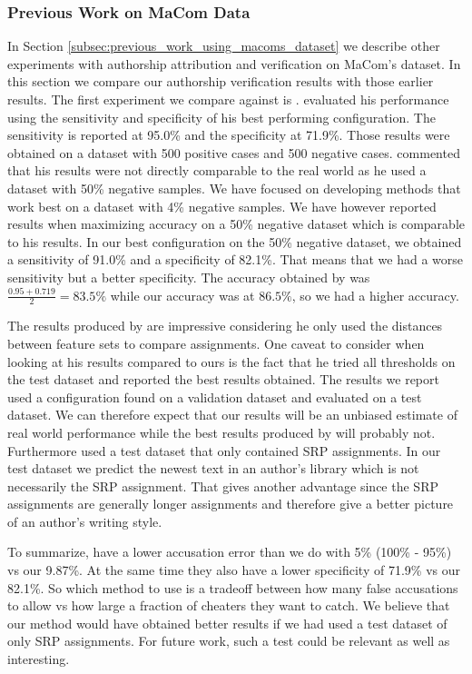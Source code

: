 \subsubsection{Previous Work on MaCom Data}

In Section \ref{subsec:previous_work_using_macoms_dataset} we describe other
experiments with authorship attribution and verification on MaCom's dataset.
In this section we compare our authorship verification results with those
earlier results. The first experiment we compare against is \citep{aalykke2016}.
\citet{aalykke2016} evaluated his performance using the sensitivity and
specificity of his best performing configuration. The sensitivity is reported at
95.0\% and the specificity at 71.9\%. Those results were obtained on a dataset
with 500 positive cases and 500 negative cases. \citet{aalykke2016} commented
that his results were not directly comparable to the real world as he used a
dataset with 50\% negative samples. We have focused on developing methods that
work best on a dataset with 4\% negative samples. We have however reported
results when maximizing accuracy on a 50\% negative dataset which is comparable
to his results. In our best configuration on the 50\% negative dataset, we
obtained a sensitivity of 91.0\% and a specificity of 82.1\%. That means that
we had a worse sensitivity but a better specificity. The accuracy obtained by
\citet{aalykke2016} was $\frac{0.95 + 0.719}{2} = 83.5\%$ while our accuracy was
at $86.5\%$, so we had a higher accuracy.

The results produced by \citet{aalykke2016} are impressive considering he only
used the distances between feature sets to compare assignments. One caveat to
consider when looking at his results compared to ours is the fact that he tried
all thresholds on the test dataset and reported the best results obtained.
The results we report used a configuration found on a validation dataset and
evaluated on a test dataset. We can therefore expect that our results will be
an unbiased estimate of real world performance while the best results produced
by \citet{aalykke2016} will probably not. Furthermore \citet{aalykke2016} used
a test dataset that only contained \gls{SRP} assignments. In our test dataset
we predict the newest text in an author's library which is not necessarily the
\gls{SRP} assignment. That gives \citet{aalykke2016} another advantage since
the \gls{SRP} assignments are generally longer assignments and therefore give a
better picture of an author's writing style.

To summarize, \citet{aalykke2016} have a lower accusation error than we do
with 5\% (100\% - 95\%) vs our 9.87\%. At the same time they also have a lower
specificity of 71.9\% vs our 82.1\%. So which method to use is a tradeoff
between how many false accusations to allow vs how large a fraction of cheaters
they want to catch. We believe that our method would have obtained better results if
we had used a test dataset of only \gls{SRP} assignments. For future work,
such a test could be relevant as well as interesting.


